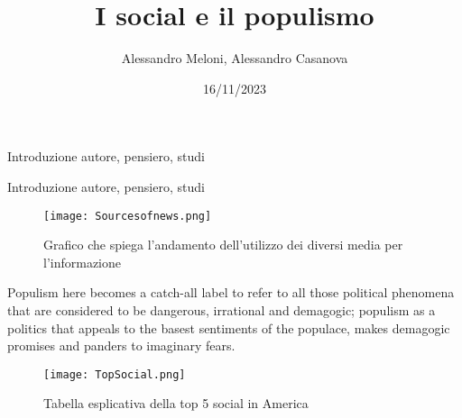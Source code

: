 \documentclass{beamer}
\title{I social e il populismo}
\author{Alessandro Meloni, Alessandro Casanova}
\date{16/11/2023}
\begin{document}
\maketitle
 
\begin{frame}
    Introduzione autore, pensiero, studi
\end{frame}

\begin{frame}
    Introduzione autore, pensiero, studi
\end{frame}
\begin{frame}
    
\end{frame}
\begin{frame}
\begin{figure}
    \flushleft
    \texttt{[image: Sourcesofnews.png]}
    \caption{Grafico che spiega l'andamento dell'utilizzo dei diversi media per l'informazione}
    \label{F:graficomezz}
    
\end{figure}
\end{frame}
\begin{frame}
    Populism here becomes a catch-all label to refer to all those political phenomena that are considered to be dangerous, irrational and demagogic; populism as a politics that appeals to the basest sentiments of the populace, makes demagogic promises and panders to imaginary fears.
    \citep{Gerbaudo2018}

\end{frame}
\begin{frame}
\begin{figure}
    \flushleft
\texttt{[image: TopSocial.png]}
    \caption{Tabella esplicativa della top 5 social in America}
    \label{F:social}
\end{figure}
\end{frame}
\begin{frame}
    
\end{frame}
\begin{frame}
    
\end{frame}
\begin{frame}
    
\end{frame}
\begin{frame}
    
\end{frame}



    
\end{document}

